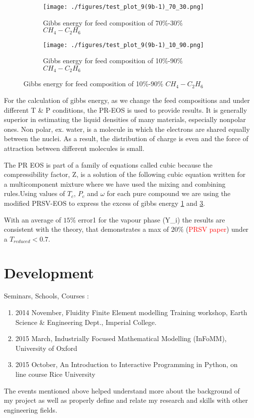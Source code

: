 \documentclass[12pt,a4paper,oneside]{report}%
\begin{document}
\begin{figure}

\centering
\begin{subfigure}{.5\textwidth}
  \centering
  \texttt{[image: ./figures/test\_plot\_9(9b-1)\_70\_30.png]}
  \caption{Gibbs energy for feed composition of 70\%-30\% $CH_{4} - C_{2}H_{6}$}
  \label{fig:70-30}
\end{subfigure}%
\begin{subfigure}{.5\textwidth}
  \centering
  \texttt{[image: ./figures/test\_plot\_9(9b-1)\_10\_90.png]}
  \caption{Gibbs energy for feed composition of 10\%-90\% $CH_{4} - C_{2}H_{6}$}
  \label{fig:10-90}
\end{subfigure}

\end{figure}

For the calculation of gibbs energy, as we change the feed compositions and under different T \& P conditions, the PR-EOS is used to provide results. It is generally superior in estimating 
the liquid  densities  of  many  materials,  especially  nonpolar ones. Non polar, ex. water, is a molecule in which the electrons are shared equally between the nuclei. As a result, the distribution of charge is even and the force of attraction between different molecules is small.

The PR EOS is part of a family of equations called cubic because the compressibility factor, Z, is a solution of the following cubic equation written for a multicomponent mixture where we have used the mixing and combining rules.Using values of $T_{c}$, $P_{c}$ and $\omega$ for each pure compound we are using the modified PRSV-EOS to express the excess of gibbs energy \ref{fig:70-30} and \ref{fig:10-90}.

With an average of $15\%$ error1 for the vapour phase (Y_{i}) the results are consistent with the theory, that demonstrates a max of $20\%$ (\textcolor{red}{PRSV paper}) under a $ T_{reduced} < 0.7$.


\pagebreak

\chapter{Development}

Seminars, Schools, Courses :

\begin{enumerate}
\item[1.] 2014 November, Fluidity Finite Element modelling Training workshop, Earth Science \& Engineering Dept., Imperial College.
\item[2.] 2015 March, Industrially Focused Mathematical Modelling (InFoMM), University of Oxford
\item[3.] 2015 October, An Introduction to Interactive Programming in Python, on line course Rice University 
\end{enumerate}
The events mentioned above helped understand more about the background of my project as well as properly define and relate my research and skills with other engineering fields.\\
\end{document}
